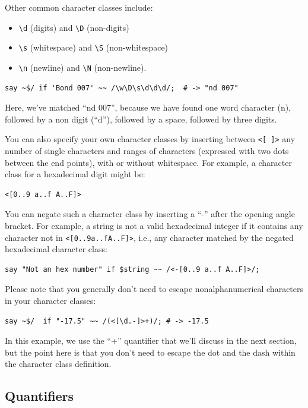 Other common character classes include:
\begin{itemize}
\item \verb'\d' (digits) and \verb'\D' (non-digits)
\item \verb'\s' (whitespace) and \verb'\S' (non-whitespace)
\item \verb'\n' (newline) and \verb'\N' (non-newline).
\end{itemize}

\begin{verbatim}
say ~$/ if 'Bond 007' ~~ /\w\D\s\d\d\d/;  # -> "nd 007"
\end{verbatim}
%

Here, we've matched ``nd 007'', because we have found one 
word character (n), followed by a non digit (``d''), followed 
by a space, followed by three digits.

You can also specify your own character classes by inserting 
between \verb'<[ ]>' any number of single characters and 
ranges of characters (expressed with two dots between the 
end points), with or without whitespace. For example, a 
character class for a hexadecimal digit might be:
\begin{verbatim}
<[0..9 a..f A..F]>
\end{verbatim}

You can negate such a character class by inserting a ``-'' after 
the opening angle bracket. For example, a string is not a 
valid hexadecimal integer if it contains any character not 
in \verb'<[0..9a..fA..F]>', i.e., any character matched by the 
negated hexadecimal character class:

\begin{verbatim}
say "Not an hex number" if $string ~~ /<-[0..9 a..f A..F]>/;
\end{verbatim}

Please note that you generally don't need to escape 
nonalphanumerical characters in your character classes:

\begin{verbatim}
say ~$/  if "-17.5" ~~ /(<[\d.-]>+)/; # -> -17.5
\end{verbatim}

In this example, we use the ``+'' quantifier that we'll discuss 
in the next section, but the point here is that you don't need 
to escape the dot and the dash within the character class 
definition.

\subsection{Quantifiers}


